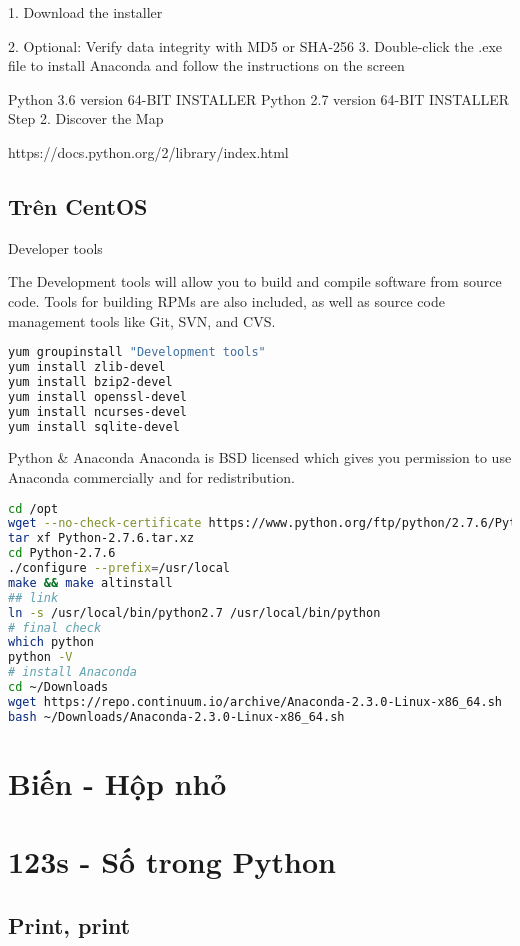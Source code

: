 1. Download the installer

2. Optional: Verify data integrity with MD5 or SHA-256
3. Double-click the .exe file to install Anaconda and follow the instructions on the screen

Python 3.6 version
64-BIT INSTALLER
Python 2.7 version
64-BIT INSTALLER
Step 2. Discover the Map

https://docs.python.org/2/library/index.html

\subsection{Trên CentOS}

Developer tools

The Development tools will allow you to build and compile software from source code. Tools for building RPMs are also included, as well as source code management tools like Git, SVN, and CVS.

\begin{lstlisting}[language=bash]
yum groupinstall "Development tools"
yum install zlib-devel
yum install bzip2-devel
yum install openssl-devel
yum install ncurses-devel
yum install sqlite-devel
\end{lstlisting}

Python & Anaconda
Anaconda is BSD licensed which gives you permission to use Anaconda commercially and for redistribution.

\begin{lstlisting}[language=bash]
cd /opt
wget --no-check-certificate https://www.python.org/ftp/python/2.7.6/Python-2.7.6.tar.xz
tar xf Python-2.7.6.tar.xz
cd Python-2.7.6
./configure --prefix=/usr/local
make && make altinstall
## link
ln -s /usr/local/bin/python2.7 /usr/local/bin/python
# final check
which python
python -V
# install Anaconda
cd ~/Downloads
wget https://repo.continuum.io/archive/Anaconda-2.3.0-Linux-x86_64.sh
bash ~/Downloads/Anaconda-2.3.0-Linux-x86_64.sh
\end{lstlisting}

\section{Biến - Hộp nhỏ}

\section{123s - Số trong Python}

\subsection{Print, print}

